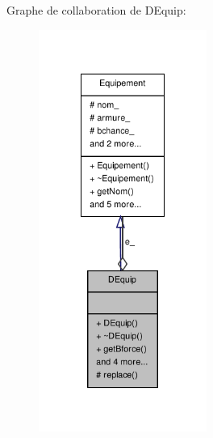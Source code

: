 Graphe de collaboration de D\-Equip\-:
\nopagebreak
\begin{figure}[H]
\begin{center}
\leavevmode
\includegraphics[width=156pt]{class_d_equip__coll__graph}
\end{center}
\end{figure}

